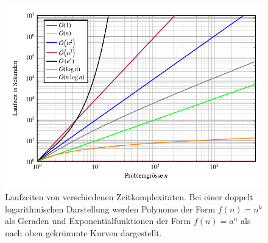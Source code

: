 \begin{figure}
	\center
	\includegraphics[]{papers/multiplikation/images/bigo}
	\caption{Laufzeiten von verschiedenen Zeitkomplexitäten. Bei einer doppelt logarithmischen Darstellung werden Polynome der Form $f(n) = n^k$ als Geraden und Exponentialfunktionen der Form $f(n) = a^n$ als nach oben gekr\"ummte Kurven dargestellt.}
	\label{multiplikation:fig:bigo}
\end{figure}
